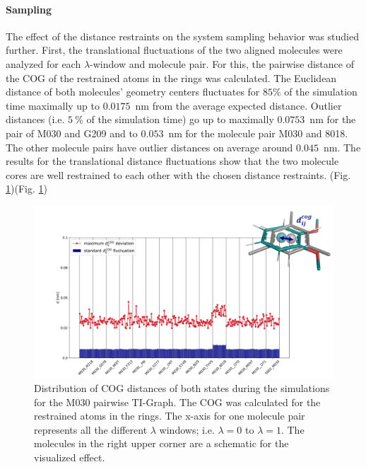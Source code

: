 \paragraph{Sampling}
The effect of the distance restraints on the system sampling behavior was studied further.
First, the translational fluctuations of the two aligned molecules were analyzed for each $\lambda$-window and molecule pair. For this, the pairwise distance of the COG of the restrained atoms in the rings was calculated. The Euclidean distance of both molecules' geometry centers fluctuates for $85\%$ of the simulation time maximally up to $0.0175$~nm from the average expected distance. Outlier distances (i.e. $5~\%$ of the simulation time) go up to maximally $0.0753$~nm for the pair of M030 and G209 and to $0.053$~nm for the molecule pair M030 and 8018. The other molecule pairs have outlier distances on average around $0.045$~nm. 
The results for the translational distance fluctuations show that the two molecule cores are well restrained to each other with the chosen distance restraints. (Fig. \ref{fig: pairCOGDist_TIStarMa})(Fig. \ref{fig: pairCOGDist_TIStarMa})

\begin{figure}[h]
    \centering
    \includegraphics[width=\textwidth]{fig/results/pairwise/sampling/TI_pairwise_dCOG_fluctuations.png}
    \caption{Distribution of COG distances of both states during the simulations for the M030 pairwise TI-Graph. The COG was calculated for the restrained atoms in the rings. The x-axis for one molecule pair represents all the different $\lambda$ windows; i.e. $\lambda = 0$ to $\lambda = 1$. The molecules in the right upper corner are a schematic for the visualized effect.}
    \label{fig: pairCOGDist_TIStarMa}
\end{figure}

